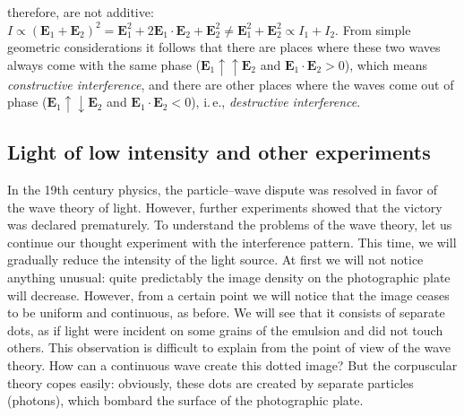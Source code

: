 \documentclass[nochecklpage]{stefan1}
\theoremstyle{definition}
\begin{document}
therefore, are not additive: $ I \propto (\boldsymbol{E}_{1} +
\boldsymbol{E}_{2}) ^{2} = \boldsymbol{E}_{1} ^{2} + 2 \boldsymbol{E}
_{1} \cdot \boldsymbol{E} _{2} + \boldsymbol{E} _{2} ^{2} \neq
\boldsymbol{E}_{1} ^{2} + \boldsymbol{E}_{2} ^{2} \propto I_{1} + I
_{2} $. From simple\vadjust{\vspace*{-6pt}\eject} geometric considerations it follows that there are
places where these two waves always come with the same phase ($
\boldsymbol{E}_{1} \uparrow \uparrow \boldsymbol{E}_{2} $ and
$ \boldsymbol{E}_{1} \cdot \boldsymbol{E}_{2}> 0 $), which means
\emph{constructive interference}, and there are other places where the
waves come out of phase ($ \boldsymbol{E}_{1} \uparrow \downarrow
\boldsymbol{E}_{2} $ and $ \boldsymbol{E}_{1} \cdot \boldsymbol{E}
_{2} <0 $), i.\,e., \emph{destructive interference}.

\vspace*{-3pt}
\subsection{Light of low intensity and other experiments}\label{ss:low-intensity}
\vspace*{-3pt}

In the 19th century physics, the particle--wave dispute was
resolved in favor of the wave theory of light. However, further
experiments showed that the victory was declared prematurely. To
understand the problems of the wave theory, let us continue our thought
experiment with the interference pattern. This time, we will gradually
reduce the intensity of the light source. At first we will not notice
anything unusual: quite predictably the image density on the
photographic plate will decrease. However, from a certain point we will
notice that the image ceases to be uniform and continuous, as before.
We will see that it consists of separate dots, as if light were incident
on some grains of the emulsion and did not touch others. This
observation is difficult to explain from the point of view of the wave
theory. How can a continuous wave create this dotted image? But the
corpuscular theory copes easily: obviously, these dots are created by
separate particles (photons), which bombard the surface of the
photographic plate.
\end{document}
